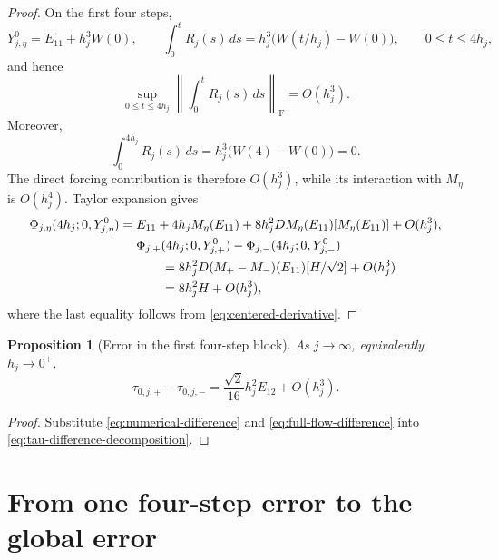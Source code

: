 \documentclass[10pt,a4paper]{amsart}
\numberwithin{equation}{section}
\newtheorem{proposition}[theorem]{Proposition}
\newcommand{\F}{\mathrm F}
\newcommand{\norm}[1]{\left\lVert #1\right\rVert}
\begin{document}
\begin{proof}
On the first four steps,
\begin{equation}\label{eq:full-flow-small-terms}
 Y_{j,\eta}^0=E_{11}+h_j^3W(0),
 \qquad
 \int_0^tR_j(s)\,ds=h_j^3\bigl(W(t/h_j)-W(0)\bigr),
 \qquad 0\le t\le4h_j,
\end{equation}
and hence
\begin{equation}\label{eq:full-flow-forcing-partial-bound}
 \sup_{0\le t\le4h_j}
 \norm{\int_0^tR_j(s)\,ds}_{\F}=O(h_j^3).
\end{equation}
Moreover,
\begin{equation}\label{eq:full-flow-forcing-cycle}
 \int_0^{4h_j}R_j(s)\,ds=h_j^3\bigl(W(4)-W(0)\bigr)=0.
\end{equation}
The direct forcing contribution is therefore $O(h_j^3)$, while its
interaction with $M_\eta$ is $O(h_j^4)$.  Taylor expansion gives
\begin{align}
 \Phi_{j,\eta}(4h_j;0,Y_{j,\eta}^0)
 ={}&E_{11}+4h_jM_\eta(E_{11})
 +8h_j^2DM_\eta(E_{11})[M_\eta(E_{11})]+O(h_j^3),
 \label{eq:full-flow-expansion}\\
 &\Phi_{j,+}(4h_j;0,Y_{j,+}^0)
 -\Phi_{j,-}(4h_j;0,Y_{j,-}^0)\notag\\
 &\qquad=8h_j^2D(M_+-M_-)(E_{11})[H/\sqrt2]
 +O(h_j^3)\notag\\
 &\qquad=8h_j^2H+O(h_j^3),
\end{align}
where the last equality follows from \eqref{eq:centered-derivative}.
\end{proof}

\begin{proposition}[Error in the first four-step block]
\label{prop:four-step}
As $j\to\infty$, equivalently $h_j\to0^+$,
\begin{equation}\label{eq:four-step-defect}
 \tau_{0,j,+}-\tau_{0,j,-}
 =\frac{\sqrt2}{16}h_j^2E_{12}+O(h_j^3).
\end{equation}
\end{proposition}

\begin{proof}
Substitute \eqref{eq:numerical-difference} and
\eqref{eq:full-flow-difference} into
\eqref{eq:tau-difference-decomposition}.
\end{proof}

\section{From one four-step error to the global error}
\label{sec:accumulation}
\end{document}
